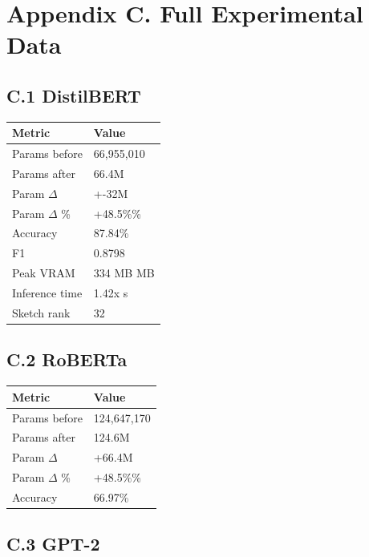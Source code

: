 
\section{Appendix C. Full Experimental Data}

\subsection{C.1 DistilBERT}

\begin{table}[H]
\centering
\small
\begin{tabular}{ll}
\toprule
\textbf{Metric} & \textbf{Value} \\
\midrule
Params before & 66,955,010 \\
Params after & 66.4M \\
Param $\Delta$ & +-32M \\
Param $\Delta$ \% & +48.5\%\% \\
Accuracy & 87.84\% \\
F1 & 0.8798 \\
Peak VRAM & 334 MB MB \\
Inference time & 1.42x s \\
Sketch rank & 32 \\
\bottomrule
\end{tabular}
\end{table}

\subsection{C.2 RoBERTa}

\begin{table}[H]
\centering
\small
\begin{tabular}{ll}
\toprule
\textbf{Metric} & \textbf{Value} \\
\midrule
Params before & 124,647,170 \\
Params after & 124.6M \\
Param $\Delta$ & +66.4M \\
Param $\Delta$ \% & +48.5\%\% \\
Accuracy & 66.97\% \\
\bottomrule
\end{tabular}
\end{table}

\subsection{C.3 GPT-2}


